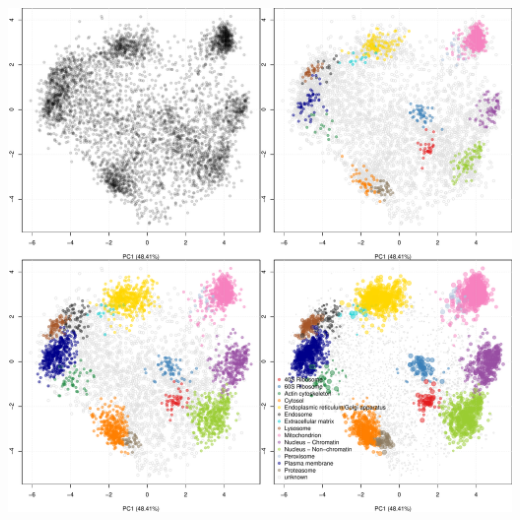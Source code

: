 \begin{frame}[fragile]
  \centering
\begin{knitrout}
\color{fgcolor}
\includegraphics[width=.8\linewidth]{figure/spatprot1eval-1} 

\end{knitrout}
\end{frame}

